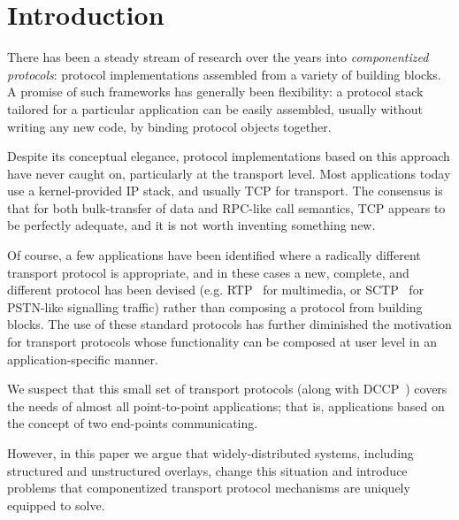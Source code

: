 \documentclass[10pt,twocolumn]{article}
\newcommand{\note}[1]{}
\begin{document}
\section{Introduction}
\label{sec:intro}

\note{Outline: This is a topic of long interest.}

There has been a steady stream of research over the years into
\emph{componentized protocols}: protocol 
implementations assembled from a variety of building blocks.  A 
promise of such frameworks has generally been
flexibility: a protocol stack tailored for a particular application
can be easily assembled, usually without writing any new code, by
binding protocol objects together. 

\note{Outline: But the interest has yet to translate to application.}

Despite its conceptual elegance, protocol
implementations based on this approach have never
caught on, particularly at the transport level.  Most
applications today use a
kernel-provided IP stack, and usually TCP for transport.  The consensus is that 
for both bulk-transfer of data and RPC-like call semantics, TCP appears to be
perfectly adequate, and it is not worth inventing something new.

\note{Outline: The few possible applications are niche.}

Of course, a few applications have been identified where a radically different
transport protocol is appropriate, and in these cases a
new, complete, and different protocol has been devised
(e.g. RTP~\cite{rfc:1889}  for multimedia, or SCTP~\cite{rfc:2960}
for PSTN-like signalling traffic) rather than composing a protocol
from building blocks.  The use of these standard protocols has further
diminished the motivation for  transport protocols whose functionality
can be composed at user level in an application-specific manner.  

\note{Outline: Summing up the lack of applicability.}

We suspect that this small set of transport protocols (along with
DCCP~\cite{dccp-problem}) covers the needs of almost all
point-to-point applications; that is, applications based on the
concept of two end-points communicating. 

\note{Outline NOW, the payoff for the promise of the title.}

However, in this paper we argue that widely-distributed systems,
including structured and unstructured overlays, change this situation
and introduce problems that componentized transport protocol
mechanisms are uniquely equipped to solve.  
\end{document}
